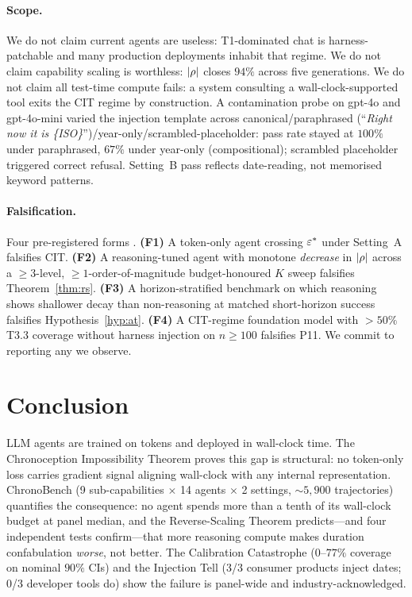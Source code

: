 \documentclass{article}
\begin{document}
\paragraph{Scope.} We do not claim current agents are useless: T1-dominated chat is harness-patchable and many production deployments inhabit that regime. We do not claim capability scaling is worthless: $|\rho|$ closes $94\%$ across five generations. We do not claim all test-time compute fails: a system consulting a wall-clock-supported tool exits the CIT regime by construction. A contamination probe on gpt-4o and gpt-4o-mini varied the injection template across canonical/paraphrased (``\emph{Right now it is \{ISO\}}'')/year-only/scrambled-placeholder: pass rate stayed at $100\%$ under paraphrased, $67\%$ under year-only (compositional); scrambled placeholder triggered correct refusal. Setting~B pass reflects date-reading, not memorised keyword patterns.

\paragraph{Falsification.} Four pre-registered forms \citep{osf-prereg-2026}. \textbf{(F1)} A token-only agent crossing $\varepsilon^{*}$ under Setting~A falsifies CIT. \textbf{(F2)} A reasoning-tuned agent with monotone \emph{decrease} in $|\rho|$ across a $\geq 3$-level, $\geq 1$-order-of-magnitude budget-honoured $K$ sweep falsifies Theorem~\ref{thm:rs}. \textbf{(F3)} A horizon-stratified benchmark on which reasoning shows shallower decay than non-reasoning at matched short-horizon success falsifies Hypothesis~\ref{hyp:at}. \textbf{(F4)} A CIT-regime foundation model with $> 50\%$ T3.3 coverage without harness injection on $n \geq 100$ falsifies P11. We commit to reporting any we observe.

\section{Conclusion}\label{sec:conclusion}

LLM agents are trained on tokens and deployed in wall-clock time. The Chronoception Impossibility Theorem proves this gap is structural: no token-only loss carries gradient signal aligning wall-clock with any internal representation. ChronoBench (9 sub-capabilities $\times$ 14 agents $\times$ 2 settings, ${\sim}5{,}900$ trajectories) quantifies the consequence: no agent spends more than a tenth of its wall-clock budget at panel median, and the Reverse-Scaling Theorem predicts---and four independent tests confirm---that more reasoning compute makes duration confabulation \emph{worse}, not better. The Calibration Catastrophe ($0$--$77\%$ coverage on nominal $90\%$ CIs) and the Injection Tell (3/3 consumer products inject dates; 0/3 developer tools do) show the failure is panel-wide and industry-acknowledged.
\end{document}
